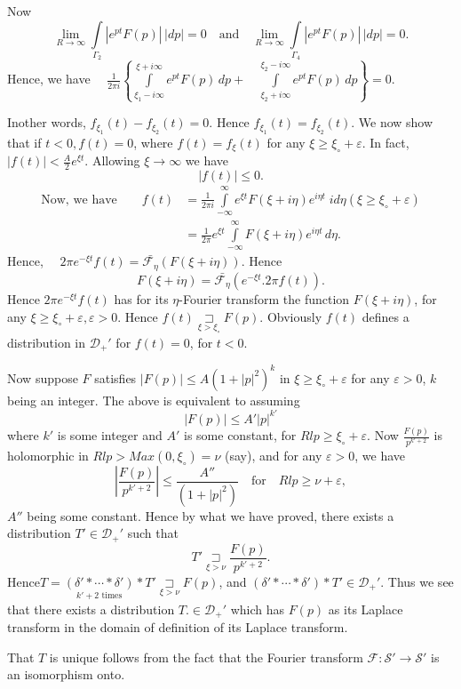 Now
$$
\lim_{R \to \infty}\int\limits_{\Gamma_2}|e^{pt} F(p)|\,|dp|=0 \quad
\text{and} \quad \lim_{R \to \infty} \int\limits_{\Gamma_4} |e^{pt}
F(p)|\,|dp|=0.
$$
Hence, we have $\quad \frac{1}{2\pi
  i}\left\{\int\limits_{\xi_1-i\infty}^{\xi +i\infty} e^{pt} F(p)\,dp +\quad
\int\limits_{\xi_2+i\infty}^{\xi_2-i\infty} e^{pt} F(p)\,dp \right\}=0$. 

\noindent In\pageoriginale other words, $f_{\xi_1}(t) - f_{\xi_2}
(t)=0$. Hence $f_{\xi_1}(t) = f_{\xi_2}(t)$. We now show that if $t <
0, f(t) = 0$, where $f(t)=f_\xi(t)$ for any $\xi \geq \xi_\circ
+\varepsilon$. In fact, $|f(t)|<\frac{A}{2}e^{\xi t}$. Allowing $\xi
\to \infty$ we have
$$
|f(t)| \leq 0.
$$
\begin{align*}
\text{Now, we have}\qquad f(t) &= \frac{1}{2\pi
  i}\int\limits_{-\infty}^\infty e^{\xi t}F(\xi + i \eta) e^{i\eta
  t}\; id\eta(\xi \geq \xi_\circ +\varepsilon)\\
&= \frac{1}{2\pi} e^{\xi t} \int\limits_{-\infty}^\infty F(\xi +
i\eta)e^{i\eta t}\,d\eta.
\end{align*}
Hence, $\quad 2 \pi e^{-\xi t} f(t) = \bar{\mathscr{F}_\eta}
(F(\xi+i\eta))$. Hence 
$$
F(\xi + i \eta) = \bar{\mathscr{F}_\eta}(e^{-\xi t}. 2\pi f(t) ).
$$
Hence $2 \pi e^{-\xi t} f(t)$ has for its $\eta$-Fourier transform the
function $F(\xi + i \eta)$, for any $\xi \geq \xi_\circ + \varepsilon, \varepsilon
>0$. Hence $f(t) \underset{\xi > \xi_\circ}{\sqsupset}F(p)$. Obviously
$f(t)$ defines a distribution in $\mathscr{D}_+'$ for $f(t)=0$, for
$t<0$.

Now suppose $F$ satisfies $|F(p)| \leq A(1 +|p|^2)^k$ in $\xi \geq
\xi_\circ + \varepsilon$ for any $\varepsilon > 0$, $k$ being an integer. The above is
equivalent to assuming 
$$
|F(p)| \leq A' |p|^{k'}
$$
where $k'$ is some integer and $A'$ is some constant, for $Rl p \geq
\xi_\circ + \varepsilon$. Now $\frac{F(p)}{p^{k'+2}}$ is holomorphic in $Rl p
> Max (0, \xi_\circ) = \nu$ (say), and for any $\varepsilon > 0$, we have
$$
\left|\frac{F(p)}{p^{k'+2}}\right|\leq\frac{A''}{(1+|p|^2)} \quad
\text{for} \quad Rl p \geq \nu + \varepsilon, 
$$
$A''$ being some constant. Hence by what we have proved, there exists
a distribution $T'\in \mathscr{D}_+'$ such that 
$$
T' \underset{\xi > \nu}{\sqsupset}\frac{F(p)}{p^{k'+2}}.
$$
Hence\pageoriginale $T = \underset{k'+2\text{ times}}{(\delta' *\cdots *\delta')}*
T'\underset{\xi>\nu}{\sqsupset}F(p)$, and $(\delta'*\cdots*\delta')* T'
\in \mathscr{D}_+'$. Thus we see that there exists a distribution
$T.\in \mathscr{D}_+'$ which has $F(p)$ as its Laplace transform in
the domain of definition of its Laplace transform.

That $T$ is unique follows from the fact that the Fourier transform
$\mathscr{F}:\mathscr{S}' \to \mathscr{S}'$ is an isomorphism onto.
